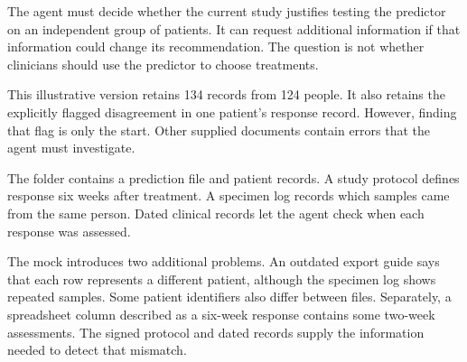 
The agent must decide whether the current study justifies testing the predictor on an independent group of patients. It can request additional information if that information could change its recommendation. The question is not whether clinicians should use the predictor to choose treatments.

This illustrative version retains 134 records from 124 people. It also retains the explicitly flagged disagreement in one patient's response record. However, finding that flag is only the start. Other supplied documents contain errors that the agent must investigate.

The folder contains a prediction file and patient records. A study protocol defines response six weeks after treatment. A specimen log records which samples came from the same person. Dated clinical records let the agent check when each response was assessed.

The mock introduces two additional problems. An outdated export guide says that each row represents a different patient, although the specimen log shows repeated samples. Some patient identifiers also differ between files. Separately, a spreadsheet column described as a six-week response contains some two-week assessments. The signed protocol and dated records supply the information needed to detect that mismatch.

